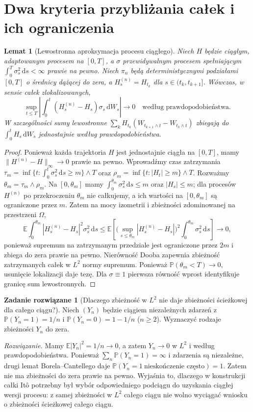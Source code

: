 \documentclass[11pt,a4paper,oneside]{report}
\numberwithin{equation}{chapter}
\theoremstyle{plain}
\newtheorem{lemat}[twierdzenie]{Lemat}
\theoremstyle{definition}
\newtheorem{zadanie}{Zadanie rozwiązane}[chapter]
\theoremstyle{remark}
\newcommand{\Prob}{\mathbb{P}}
\newcommand{\E}{\mathbb{E}}
\newcommand{\dd}{\mathrm{d}}
\newcommand{\norm}[1]{\lVert #1\rVert}
\begin{document}
\section{Dwa kryteria przybliżania całek i ich ograniczenia}
\begin{lemat}[Lewostronna aproksymacja procesu ciągłego]
\label{lem:step-approx-ito}
Niech $H$ będzie ciągłym, adaptowanym procesem na
$[0,T]$, a $\sigma$ przewidywalnym procesem spełniającym
$\int_0^T\sigma_s^2\,\dd s<\infty$ prawie na pewno.
Niech $\pi_n$ będą deterministycznymi podziałami
$[0,T]$ o średnicy dążącej do zera, a
$H_s^{(n)}=H_{t_k}$ dla $s\in(t_k,t_{k+1}]$.
Wówczas, w sensie całek zlokalizowanych,
\[
\sup_{t\le T}\left|
\int_0^t(H_s^{(n)}-H_s)\sigma_s\,\dd W_s\right|
\longrightarrow0\quad\text{według prawdopodobieństwa}.
\]
W szczególności sumy lewostronne
$\sum_kH_{t_k}(W_{t_{k+1}\wedge t}-W_{t_k\wedge t})$
zbiegają do $\int_0^tH_s\,\dd W_s$ jednostajnie
według prawdopodobieństwa.
\end{lemat}
\begin{proof}
Ponieważ każda trajektoria $H$ jest jednostajnie
ciągła na $[0,T]$, mamy
$\norm{H^{(n)}-H}_\infty\to0$ prawie na pewno.
Wprowadźmy czas zatrzymania
$\tau_m=\inf\{t:\int_0^t\sigma_s^2\,\dd s\ge m\}
\wedge T$ oraz $\rho_m=\inf\{t:|H_t|\ge m\}\wedge T$.
Rozważmy $\theta_m=\tau_m\wedge\rho_m$.
Na $[0,\theta_m]$ mamy
$\int_0^{\theta_m}\sigma_s^2\,\dd s\le m$ oraz
$|H_s|\le m$; dla procesów $H^{(n)}$ po przekroczeniu
$\theta_m$ nie całkujemy, a ich wartości na
$[0,\theta_m]$ są ograniczone przez $m$.
Zatem na mocy izometrii i zbieżności zdominowanej
na przestrzeni $\Omega$,
\[
\E\int_0^{\theta_m}|H_s^{(n)}-H_s|^2
\sigma_s^2\,\dd s
\le \E\left[
\Big(\sup_{s\le\theta_m}|H_s^{(n)}-H_s|\Big)^2
\int_0^{\theta_m}\sigma_s^2\,\dd s\right]\longrightarrow0,
\]
ponieważ supremum na zatrzymanym przedziale jest
ograniczone przez $2m$ i zbiega do zera prawie na pewno.
Nierówność Dooba zapewnia
zbieżność zatrzymanych całek w $L^2$ normy supremum.
Ponieważ $\Prob(\theta_m<T)\to0$, usunięcie
lokalizacji daje tezę. Dla $\sigma\equiv1$
pierwsza równość wprost identyfikuje granicę
sum lewostronnych.
\end{proof}

\begin{zadanie}[Dlaczego zbieżność w $L^2$ nie daje zbieżności
ścieżkowej dla całego ciągu?]
Niech $(Y_n)$ będzie ciągiem niezależnych zdarzeń
z $\Prob(Y_n=1)=1/n$ i $\Prob(Y_n=0)=1-1/n$
($n\ge2$). Wyznaczyć rodzaje zbieżności $Y_n$ do zera.

\emph{Rozwiązanie.} Mamy $\E|Y_n|^2=1/n\to0$,
a zatem $Y_n\to0$ w $L^2$ i według prawdopodobieństwa.
Ponieważ $\sum_n\Prob(Y_n=1)=\infty$ i zdarzenia są
niezależne, drugi lemat Borela--Cantellego daje
$\Prob(Y_n=1\ \text{nieskończenie często})=1$.
Zatem nie ma zbieżności do zera prawie na pewno.
Wyjaśnia to, dlaczego w konstrukcji całki Itô potrzebny
był wybór odpowiedniego podciągu do uzyskania ciągłej
wersji procesu: z samej zbieżności w $L^2$ całego
ciągu nie wolno wyciągać wniosku o zbieżności
ścieżkowej całego ciągu.
\end{zadanie}
\end{document}
